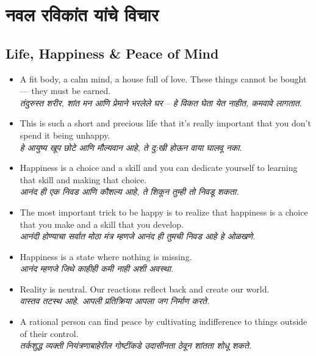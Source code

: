 \chapter{नवल रविकांत  यांचे विचार }

\section*{Life, Happiness \& Peace of Mind}
\begin{itemize}
  \item A fit body, a calm mind, a house full of love. These things cannot be bought — they must be earned. \\
  \textit{तंदुरुस्त शरीर, शांत मन आणि प्रेमाने भरलेले घर – हे विकत घेता येत नाहीत, कमवावे लागतात.}

  \item This is such a short and precious life that it’s really important that you don’t spend it being unhappy. \\
  \textit{हे आयुष्य खूप छोटे आणि मौल्यवान आहे, ते दु:खी होऊन वाया घालवू नका.}

  \item Happiness is a choice and a skill and you can dedicate yourself to learning that skill and making that choice. \\
  \textit{आनंद ही एक निवड आणि कौशल्य आहे, ते शिकून तुम्ही तो निवडू शकता.}

  \item The most important trick to be happy is to realize that happiness is a choice that you make and a skill that you develop. \\
  \textit{आनंदी होण्याचा सर्वात मोठा मंत्र म्हणजे आनंद ही तुमची निवड आहे हे ओळखणे.}

  \item Happiness is a state where nothing is missing. \\
  \textit{आनंद म्हणजे जिथे काहीही कमी नाही अशी अवस्था.}

  \item Reality is neutral. Our reactions reflect back and create our world. \\
  \textit{वास्तव तटस्थ आहे. आपली प्रतिक्रिया आपला जग निर्माण करते.}

  \item A rational person can find peace by cultivating indifference to things outside of their control. \\
  \textit{तर्कशुद्ध व्यक्ती नियंत्रणाबाहेरील गोष्टींकडे उदासीनता ठेवून शांतता शोधू शकते.}


\end{itemize}
